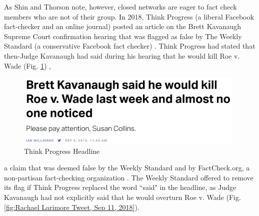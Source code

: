 \documentclass[preprint,review,12pt]{elsarticle}
\begin{document}
 As Shin and Thorson note, however, closed networks are eager to fact check members who are not of their group. In 2018, Think Progress (a liberal Facebook fact-checker and an online journal) posted an article on the Brett Kavanaugh Supreme Court confirmation hearing that was flagged as false by The Weekly Standard (a conservative Facebook fact checker) \cite{lybrand2018kavanaugh}. Think Progress had stated that then-Judge Kavanaugh had said during his hearing that he would kill Roe v. Wade (Fig. \ref{fig:Think Progress Headline}) \cite{millhiser2018brett},
  \begin{figure}[h]
    \centering
    \includegraphics[width=11cm]{ThinkProgress Headline.png}
    \caption{Think Progress Headline \cite{millhiser2018brett}}
    \label{fig:Think Progress Headline}
\end{figure} a claim that was deemed false by the Weekly Standard and by FactCheck.org, a non-partisan fact-checking organization \cite{gore2018kavanaugh}. The Weekly Standard offered to remove its flag if Think Progress replaced the word ``said" in the headline, as Judge Kavanaugh had not explicitly said that he would overturn Roe v. Wade (Fig. \ref{fig:Rachael Larimore Tweet, Sep 11, 2018}).
 
\end{document}
